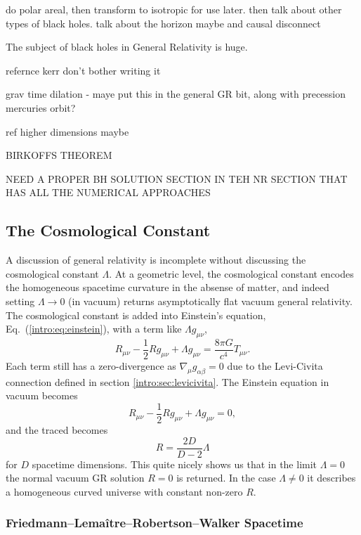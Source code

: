  do polar areal, then transform to isotropic for use later. then talk about other types of black holes. talk about the horizon maybe and causal disconnect

The subject of black holes in General Relativity is huge.

refernce kerr don't bother writing it

grav time dilation - maye put this in the general GR bit, along with precession mercuries orbit? 

ref higher dimensions maybe

BIRKOFFS THEOREM

NEED A PROPER BH SOLUTION SECTION IN TEH NR SECTION THAT HAS ALL THE NUMERICAL APPROACHES



\subsection{The Cosmological Constant}
A discussion of general relativity is incomplete without discussing the cosmological constant $\Lambda$. At a geometric level, the cosmological constant encodes the homogeneous spacetime curvature in the absense of matter, and indeed setting $\Lambda\rightarrow 0$ (in vacuum) returns asymptotically flat vacuum general relativity. The cosmological constant is added into Einstein's equation, Eq.~(\ref{intro:eq:einstein}), with a term like $\Lambda g_{\mu\nu}$,
\begin{equation} \label{intro:eq:einsteinlambda}
R_{\mu\nu}-\frac{1}{2}Rg_{\mu\nu}  +  \Lambda g_{\mu\nu} = \frac{8 \pi G}{c^4}T_{\mu\nu}.
\end{equation}
Each term still has a zero-divergence as $\nabla_\mu g_{\alpha\beta}=0$ due to the Levi-Civita connection defined in section \ref{intro:sec:levicivita}. The Einstein equation in vacuum becomes
\begin{equation}
R_{\mu\nu}-\frac{1}{2}Rg_{\mu\nu} + \Lambda g_{\mu\nu} = 0,
\end{equation}
and the traced becomes
\begin{equation}
R = \frac{2D}{D-2}\Lambda
\end{equation}
for $D$ spacetime dimensions. This quite nicely shows us that in the limit $\Lambda=0$ the normal vacuum GR solution $R=0$ is returned. In the case $\Lambda\neq 0$ it describes a homogeneous curved universe with constant non-zero $R$.

\subsubsection*{Friedmann–Lemaître–Robertson–Walker Spacetime}

